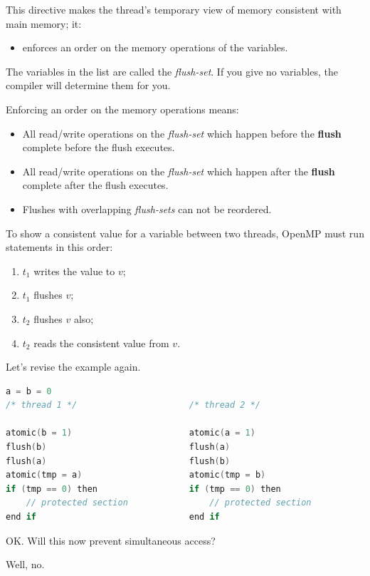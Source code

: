 \documentclass[a4paper]{report}
\begin{document}
This directive makes the thread's temporary view of memory consistent with main
      memory; it:
\begin{itemize}
    \item enforces an order on the memory operations of the variables.
\end{itemize}

The variables in the list are called the {\it flush-set}. 
If you give no variables, the compiler will determine them for you.

Enforcing an order on the memory operations means:
\begin{itemize}
    \item All read/write operations on the {\it flush-set} which happen
      before the {\bf flush} complete before the flush executes.
    \item All read/write operations on the {\it flush-set} which happen
      after the {\bf flush} complete after the flush executes.
    \item Flushes with overlapping {\it flush-sets} can not be reordered.
\end{itemize}

To show a consistent value for a variable between two threads, OpenMP
must run statements in this order:

  \begin{enumerate}
    \item $t_1$ writes the value to $v$;
    \item $t_1$ flushes $v$; 
    \item $t_2$ flushes $v$ also;
    \item $t_2$ reads the consistent value from $v$.
  \end{enumerate}

Let's revise the example again.
  \begin{lstlisting}[language=C]
                    a = b = 0
/* thread 1 */                      /* thread 2 */

atomic(b = 1)                       atomic(a = 1)
flush(b)                            flush(a)
flush(a)                            flush(b)
atomic(tmp = a)                     atomic(tmp = b)
if (tmp == 0) then                  if (tmp == 0) then
    // protected section                // protected section
end if                              end if
  \end{lstlisting}

OK. Will this now prevent simultaneous access?

Well, no.
\end{document}
